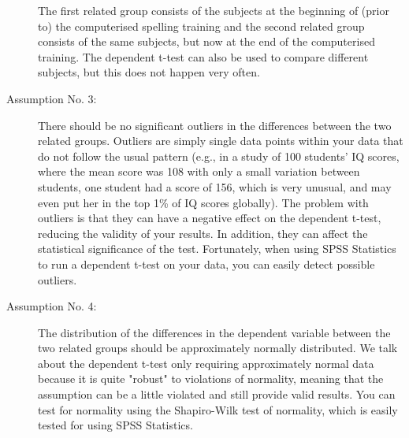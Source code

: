 \documentclass[]{article}
\begin{document}
\begin{description}
	The first related group consists of the subjects at the beginning of (prior to) the computerised spelling training and the second related group consists of the same subjects, but now at the end of the computerised training. The dependent t-test can also be used to compare different subjects, but this does not happen very often.
	\item[ Assumption No. 3:] There should be no significant outliers in the differences between the two related groups. Outliers are simply single data points within your data that do not follow the usual pattern (e.g., in a study of 100 students' IQ scores, where the mean score was 108 with only a small variation between students, one student had a score of 156, which is very unusual, and may even put her in the top 1\% of IQ scores globally). The problem with outliers is that they can have a negative effect on the dependent t-test, reducing the validity of your results. In addition, they can affect the statistical significance of the test. Fortunately, when using SPSS Statistics to run a dependent t-test on your data, you can easily detect possible outliers. 
	\item[ Assumption No. 4:] The distribution of the differences in the dependent variable between the two related groups should be approximately normally distributed. We talk about the dependent t-test only requiring approximately normal data because it is quite "robust" to violations of normality, meaning that the assumption can be a little violated and still provide valid results. You can test for normality using the Shapiro-Wilk test of normality, which is easily tested for using SPSS Statistics.
\end{description}
\end{document}
